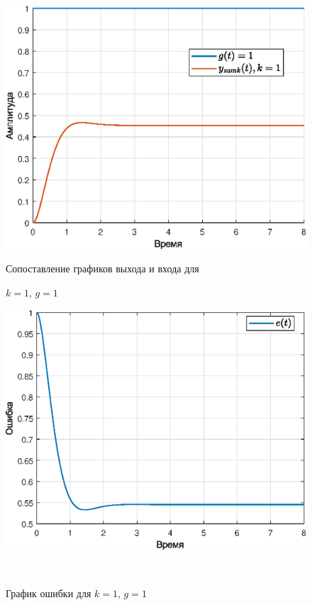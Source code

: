 \documentclass[a4paper]{article}
\begin{document}
\begin{figure}[H]
    \begin{minipage}{0.5\textwidth}
        \centering \includegraphics[width=\textwidth]{ex3/k1_g_a.eps}
        \caption{Сопоставление графиков выхода и входа для}
        \centerline{$k=1$, $g=1$}
    \end{minipage}\hfill
    \begin{minipage}{0.5\textwidth}
        \centering \includegraphics[width=\textwidth]{ex3/k1_g_a_error.eps}
        \caption{График ошибки для $k=1$, $g=1$}
    \end{minipage}\\[1em]
\end{figure}\noindent\
\end{document}
